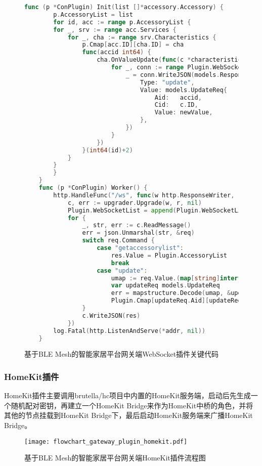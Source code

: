 \begin{figure}[H]
    \centering
    \begin{lstlisting}[language=Go]
    func (p *ConPlugin) Init(list []*accessory.Accessory) {
        p.AccessoryList = list
        for id, acc := range p.AccessoryList {
		for _, srv := range acc.Services {
			for _, cha := range srv.Characteristics {
				p.Cmap[acc.ID][cha.ID] = cha
				func(accid int64) {
					cha.OnValueUpdate(func(c *characteristic.Characteristic, newValue, oldValue interface{}) {
						for _, conn := range Plugin.WebSocketList {
							_ = conn.WriteJSON(models.Response{
								Type: "update",
								Value: models.UpdateReq{
									Aid:   accid,
									Cid:   c.ID,
									Value: newValue,
								},
							})
						}
					})
				}(int64(id)+2)
			}
		}
        }
    }
    func (p *ConPlugin) Worker() {
	    http.HandleFunc("/ws", func(w http.ResponseWriter, r *http.Request) {
            c, err := upgrader.Upgrade(w, r, nil)
            Plugin.WebSocketList = append(Plugin.WebSocketList, c)
            for {
                _, str, err := c.ReadMessage()
                err = json.Unmarshal(str, &req)
                switch req.Command {
                    case "getaccessorylist":
                        res.Value = Plugin.AccessoryList
                        break
                    case "update":
                        umap := req.Value.(map[string]interface{})
                        var updateReq models.UpdateReq
                        err = mapstructure.Decode(umap, &updateReq)
                        Plugin.Cmap[updateReq.Aid][updateReq.Cid].UpdateValue(updateReq.Value)
                }
                c.WriteJSON(res)
            })
	    log.Fatal(http.ListenAndServe(*addr, nil))
    }
    \end{lstlisting}
    \caption{基于BLE Mesh的智能家居平台网关端WebSocket插件关键代码}
    \label{fig:code_gateway_plugin_websocket}
\end{figure}

\subsubsection{HomeKit插件}
HomeKit插件主要调用brutella/hc项目中内置的HomeKit服务端，启动后先生成一个随机配对密钥，再建立一个HomeKit Bridge来作为HomeKit中桥的角色，并将其他的节点挂载到HomeKit Bridge下，最后启动HomeKit服务端来广播HomeKit Bridge。

\begin{figure}[H]
    \centering
    \texttt{[image: flowchart\_gateway\_plugin\_homekit.pdf]}
    \caption{基于BLE Mesh的智能家居平台网关端HomeKit插件流程图}
    \label{fig:flowchart_gateway_plugin_homekit}
\end{figure}

